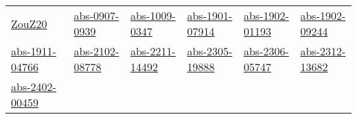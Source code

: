 \begin{longtable}{*{6}{l}}
\href{works/ZouZ20.pdf}{ZouZ20}~\cite{ZouZ20} & \href{works/abs-0907-0939.pdf}{abs-0907-0939}~\cite{abs-0907-0939} & \href{works/abs-1009-0347.pdf}{abs-1009-0347}~\cite{abs-1009-0347} & \href{works/abs-1901-07914.pdf}{abs-1901-07914}~\cite{abs-1901-07914} & \href{works/abs-1902-01193.pdf}{abs-1902-01193}~\cite{abs-1902-01193} & \href{works/abs-1902-09244.pdf}{abs-1902-09244}~\cite{abs-1902-09244}\\ 
\href{works/abs-1911-04766.pdf}{abs-1911-04766}~\cite{abs-1911-04766} & \href{works/abs-2102-08778.pdf}{abs-2102-08778}~\cite{abs-2102-08778} & \href{works/abs-2211-14492.pdf}{abs-2211-14492}~\cite{abs-2211-14492} & \href{works/abs-2305-19888.pdf}{abs-2305-19888}~\cite{abs-2305-19888} & \href{works/abs-2306-05747.pdf}{abs-2306-05747}~\cite{abs-2306-05747} & \href{works/abs-2312-13682.pdf}{abs-2312-13682}~\cite{abs-2312-13682}\\ 
\href{works/abs-2402-00459.pdf}{abs-2402-00459}~\cite{abs-2402-00459} & \end{longtable}
